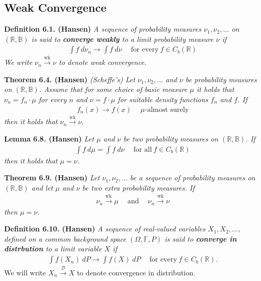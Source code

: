 \documentclass[a4paper,10pt,openany]{book}
\begin{document}
\hypertarget{weak-convergence}{%
\subsection{Weak Convergence}\label{weak-convergence}}

\textbf{Definition 6.1. (Hansen)} \emph{A sequence of probability measures \(\nu_1,\nu_2,...\) on \((\mathbb{R},\mathbb{B})\) is said to \textbf{converge weakly} to a limit probability measure \(\nu\) if}
\begin{align*}
    \int f\ d\nu_n\to \int f\ d\nu\hspace{15pt}\text{for every}\ f\in C_b(\mathbb{R})\tag{6.2}
\end{align*}
\emph{We write \(\nu_n\stackrel{\text{wk}}{\to} \nu\) to denote weak convergence.}

\textbf{Theorem 6.4. (Hansen)} \emph{(Scheffe's) Let \(\nu_1,\nu_2,...\) and \(\nu\) be probability measures on \((\mathbb{R},\mathbb{B})\). Assume that for some choice of basic measure \(\mu\) it holds that \(\nu_n=f_n\cdot \mu\) for every \(n\) and \(\nu = f\cdot \mu\) for suitable density functions \(f_n\) and \(f\). If}
\begin{align*}
    f_n(x)\to f(x)\hspace{15pt}\mu\text{-almost surely}
\end{align*}
\emph{then it holds that \(\nu_n\stackrel{\text{wk}}{\to} \nu\).}

\textbf{Lemma 6.8. (Hansen)} \emph{Let \(\mu\) and \(\nu\) be two probability measures on \((\mathbb{R},\mathbb{B})\). If}
\begin{align*}
    \int f\ d\mu=\int f\ d\nu\hspace{15pt}\text{for all}\ f\in C_b(\mathbb{R})\tag{6.7}
\end{align*}
\emph{then it holds that \(\mu=\nu\).}

\textbf{Theorem 6.9. (Hansen)} \emph{Let \(\nu_1,\nu_2,...\) be a sequence of probability measures on \((\mathbb{R},\mathbb{B})\) and let \(\mu\) and \(\nu\) be two extra probability measures. If}
\begin{align*}
    \nu_n\stackrel{\text{wk}}{\to} \mu\hspace{15pt}\text{and}\hspace{15pt}\nu_n\stackrel{\text{wk}}{\to} \nu
\end{align*}
\emph{then \(\mu=\nu\).}

\textbf{Definition 6.10. (Hansen)} \emph{A sequence of real-valued variables \(X_1,X_2,...\), defined on a common background space \((\Omega,\mathbb{F},P)\) is said to \textbf{converge in distrbution} to a limit variable \(X\) if}
\begin{align*}
    \int f(X_n)\ dP\to \int f(X)\ dP\hspace{15pt}\text{for every}\ f\in C_b(\mathbb{R}).\tag{6.9}
\end{align*}
We will write \(X_n\stackrel{\mathcal{D}}{\to} X\) to denote convergence in distribution.
\end{document}

